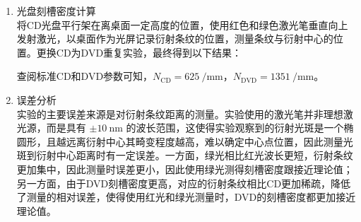 \documentclass[a4paper]{article}
\begin{document}
\begin{enumerate}[label=\chinese*.,left=0pt]
\begin{enumerate}[label=\arabic*.,left=0pt]
        \item 光盘刻槽密度计算
        \\
        将CD光盘平行架在离桌面一定高度的位置，使用红色和绿色激光笔垂直向上发射激光，以桌面作为光屏记录衍射条纹的位置，测量条纹与衍射中心的位置。更换CD为DVD重复实验，最终得到以下结果：
        \begin{table}[H]
            \caption{衍射条纹测量数据与计算结果}
            \label{tab:data-2}
            \centering
        \end{table}
        查阅标准CD和DVD参数可知，$N_\text{CD} = \qty{625}{\per \mm}$，$N_\text{DVD}=\qty{1351}{\per \mm}$。

        \item 误差分析
        \\
        实验的主要误差来源是对衍射条纹距离的测量。实验使用的激光笔并非理想激光源，而是具有 $\pm\qty{10}{\nm}$ 的波长范围，这使得实验观察到的衍射光斑是一个椭圆形，且越远离衍射中心其畸变程度越高，难以确定中心点位置，因此测量光斑到衍射中心距离时有一定误差。一方面，绿光相比红光波长更短，衍射条纹更加集中，因此测量时误差更小，因此使用绿光测得刻槽密度跟接近理论值；另一方面，由于DVD刻槽密度更高，对应的衍射条纹相比CD更加稀疏，降低了测量的相对误差，使得使用红光和绿光测量时，DVD的刻槽密度都更加接近理论值。
        
    \end{enumerate}
    



\end{enumerate}
\end{document}
